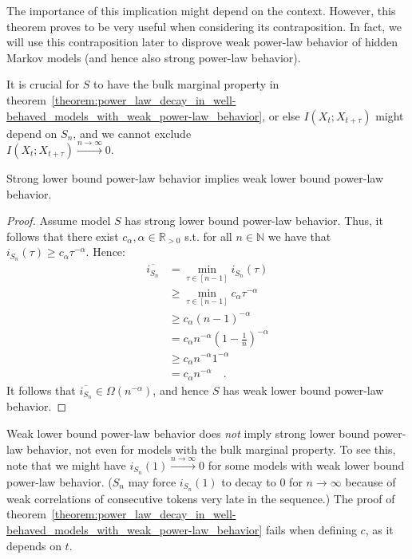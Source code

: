 \documentclass[../../main.tex]{subfiles}
\begin{document}
    \begin{remark}
        The importance of this implication might depend on the context. However, this theorem proves to be very useful when considering its contraposition. In fact, we will use this contraposition later to disprove weak power-law behavior of hidden Markov models (and hence also strong power-law behavior).
    \end{remark}

    \begin{remark}
        It is crucial for $S$ to have the bulk marginal property in theorem~\ref{theorem:power_law_decay_in_well-behaved_models_with_weak_power-law_behavior}, or else $I(X_{t}; X_{t + \tau})$ might depend on $S_n$, and we cannot exclude \\ $I(X_{t}; X_{t + \tau}) \xrightarrow{n \to \infty} 0$.
    \end{remark}

\pagebreak
    \begin{proposition}
        \label{proposition:strong_slbplb_implies_wlbplb}
        Strong lower bound power-law behavior implies weak lower bound power-law behavior.
    \end{proposition}
    \vspace{-2.5em}
    \begin{proof}
        Assume model $S$ has strong lower bound power-law behavior. Thus, it follows that there exist $c_\alpha, \alpha \in \mathbb{R}_{>0}$ s.t. for all $n \in \mathbb{N}$ we have that $i_{S_n}(\tau) \geq c_\alpha \tau^{-\alpha}$. Hence:
        \begin{align*}
            \overline{i_{S_n}} &= \min_{\tau \in [n - 1]} i_{S_n}(\tau) \\
            &\geq \min_{\tau \in [n - 1]} c_\alpha \tau^{-\alpha} \\
            &\geq c_\alpha (n - 1)^{-\alpha} \\
            &= c_\alpha n^{-\alpha} (1 - \frac{1}{n})^{-\alpha} \\
            &\geq c_\alpha n^{-\alpha} 1^{-\alpha} \\
            &= c_\alpha n^{-\alpha} \quad .
        \end{align*}
        It follows that $\overline{i_{S_n}} \in \Omega(n^{-\alpha})$, and hence $S$ has weak lower bound power-law behavior.
    \end{proof}

    \begin{remark}
        Weak lower bound power-law behavior does \emph{not} imply strong lower bound power-law behavior, not even for models with the bulk marginal property. To see this, note that we might have  $i_{S_n}(1) \xrightarrow{n \to \infty} 0$ for some models with weak lower bound power-law behavior. ($S_n$ may force $i_{S_n}(1)$ to decay to $0$ for $n \to \infty$ because of weak correlations of consecutive tokens very late in the sequence.) The proof of theorem~\ref{theorem:power_law_decay_in_well-behaved_models_with_weak_power-law_behavior} fails when defining $c$, as it depends on $t$.
    \end{remark}
\end{document}
